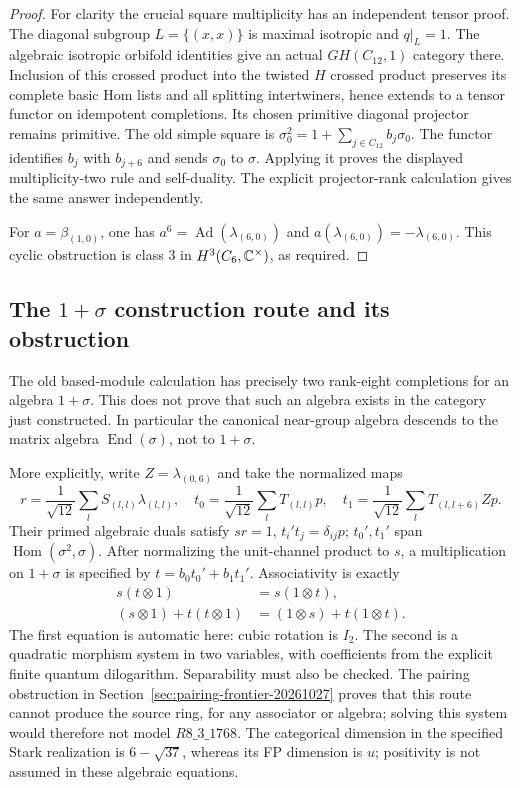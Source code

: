 \begin{proof}
For clarity the crucial square multiplicity has an independent tensor
proof. The diagonal subgroup $L=\{(x,x)\}$ is maximal isotropic and
$q|_L=1$. The algebraic isotropic orbifold identities give an actual
$GH(C_{12},1)$ category there. Inclusion of this crossed product into
the twisted $H$ crossed product preserves its complete basic Hom
lists and all splitting intertwiners, hence extends to a tensor functor
on idempotent completions. Its chosen primitive diagonal projector
remains primitive. The old simple square is
$\sigma_0^2=1+\sum_{j\in C_{12}}b_j\sigma_0$.
The functor identifies $b_j$ with $b_{j+6}$ and sends $\sigma_0$ to
$\sigma$. Applying it proves the displayed multiplicity-two rule and
self-duality. The explicit projector-rank calculation gives the same
answer independently.

For $a=\beta_{(1,0)}$, one has
$a^6=\operatorname{Ad}(\lambda_{(6,0)})$ and
$a(\lambda_{(6,0)})=-\lambda_{(6,0)}$. This cyclic obstruction is
class $3$ in $H^3(C_6,\mathbb C^\times)$, as required.
\end{proof}

\subsection{The $1+\sigma$ construction route and its obstruction}
The old based-module calculation has precisely two rank-eight
completions for an algebra $1+\sigma$. This does not prove that such
an algebra exists in the category just constructed. In particular the
canonical near-group algebra descends to the matrix algebra
$\operatorname{End}(\sigma)$, not to $1+\sigma$.

More explicitly, write $Z=\lambda_{(0,6)}$ and take the normalized
maps
\[
 r=\frac1{\sqrt{12}}\sum_l S_{(l,l)}\lambda_{(l,l)},\quad
 t_0=\frac1{\sqrt{12}}\sum_lT_{(l,l)}p,\quad
 t_1=\frac1{\sqrt{12}}\sum_lT_{(l,l+6)}Zp.
\]
Their primed algebraic duals satisfy $sr=1$, $t_i't_j=\delta_{ij}p$;
$t_0',t_1'$ span $\operatorname{Hom}(\sigma^2,\sigma)$.
After normalizing the unit-channel product to $s$, a multiplication
on $1+\sigma$ is specified by $t=b_0t_0'+b_1t_1'$. Associativity is
exactly
\begin{align*}
 s(t\otimes1)&=s(1\otimes t),\\
 (s\otimes1)+t(t\otimes1)&=(1\otimes s)+t(1\otimes t).
\end{align*}
The first equation is automatic here: cubic rotation is $I_2$.
The second is a quadratic morphism system in two variables, with
coefficients from the explicit finite quantum dilogarithm. Separability must also be checked. The pairing obstruction in Section~\ref{sec:pairing-frontier-20261027} proves that this route cannot produce the source ring, for any associator or algebra; solving this system would therefore not model $R8\_3\_1768$.
The categorical dimension in the specified Stark realization is
$6-\sqrt{37}$, whereas its FP dimension is $u$; positivity is not
assumed in these algebraic equations.

